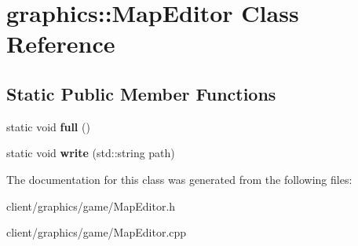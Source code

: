 \hypertarget{classgraphics_1_1_map_editor}{\section{graphics\-:\-:Map\-Editor Class Reference}
\label{classgraphics_1_1_map_editor}
}
\subsection*{Static Public Member Functions}
\begin{DoxyCompactItemize}
\item 
\hypertarget{classgraphics_1_1_map_editor_ae6be716d385597ab6692e45c1f091865}{static void {\bfseries full} ()}\label{classgraphics_1_1_map_editor_ae6be716d385597ab6692e45c1f091865}

\item 
\hypertarget{classgraphics_1_1_map_editor_a26061e6e513028dc7ef13ca91c848984}{static void {\bfseries write} (std\-::string path)}\label{classgraphics_1_1_map_editor_a26061e6e513028dc7ef13ca91c848984}

\end{DoxyCompactItemize}


The documentation for this class was generated from the following files\-:\begin{DoxyCompactItemize}
\item 
client/graphics/game/Map\-Editor.\-h\item 
client/graphics/game/Map\-Editor.\-cpp\end{DoxyCompactItemize}
